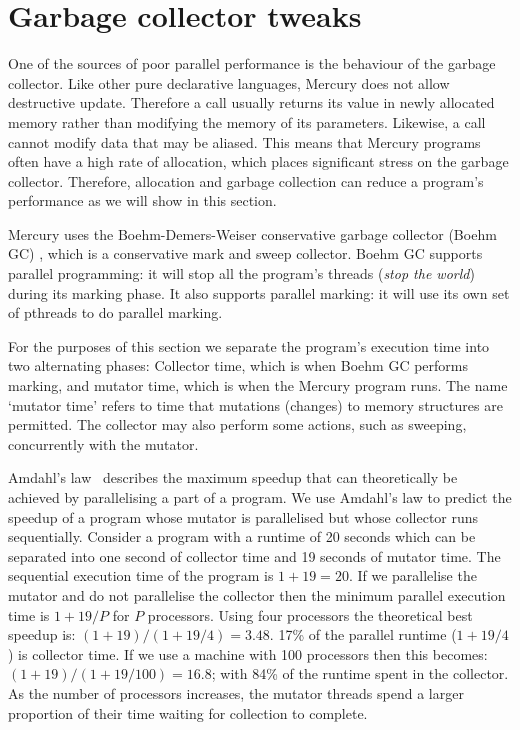 
\section{Garbage collector tweaks}
\label{sec:rts_gc}

One of the sources of poor parallel performance is the behaviour of the
garbage collector.
Like other pure declarative languages,
Mercury does not allow destructive update.
Therefore a call usually returns its value in newly allocated memory
rather than modifying the memory of its parameters.
Likewise, a call cannot modify data that may be aliased.
This means that Mercury programs often have a high rate of allocation,
which places significant stress on the garbage collector.
Therefore,
allocation and garbage collection can reduce a program's
performance as we will show in this section.

Mercury uses the Boehm-Demers-Weiser conservative garbage collector (Boehm GC)
\citep{boehm:1988:gc},
which is a conservative mark and sweep collector.
Boehm GC supports parallel programming:
it will stop all the program's threads (\emph{stop the world}) during its
marking phase.
It also supports parallel marking:
it will use its own set of pthreads to do parallel marking.

For the purposes of this section
we separate the program's execution time into two alternating phases:
Collector time, which is when Boehm GC performs marking,
and mutator time, which is when the Mercury program runs.
The name `mutator time' refers to time that mutations (changes) to memory
structures are permitted.
The collector may also perform some actions,
such as sweeping,
concurrently with the mutator.

Amdahl's law~\citep{amdahl:1967:law} describes the maximum speedup that
can theoretically be achieved by parallelising a part of a program.
We use Amdahl's law to predict the speedup of a program whose
mutator is parallelised but whose collector runs sequentially.
Consider a program with a runtime of 20 seconds
which can be separated into one second of collector time and 19 seconds
of mutator time.
The sequential execution time of the program is $1 + 19 = 20$.
If we parallelise the mutator and do not parallelise the
collector then the minimum parallel execution time is $1 + 19/P$
for $P$ processors.
Using four processors the theoretical best speedup is:
$(1 + 19) / (1 + 19/4) = 3.48$.
17\% of the parallel runtime ($1 + 19/4$) is collector time.
If we use a machine with 100 processors then this becomes:
$(1 + 19) / (1 + 19/100) = 16.8$;
with 84\% of the runtime spent in the collector.
As the number of processors increases,
the mutator threads spend a larger proportion of their time waiting for
collection to complete.

